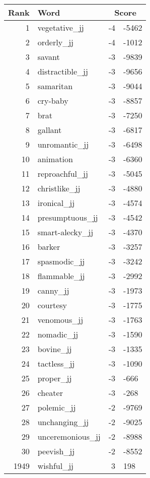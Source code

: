 \begin{longtable}[!htbp]{| rlr@{.}l |}
    \hline
    \textbf{Rank} & \textbf{Word} & \multicolumn{2}{c|}{\textbf{Score}} \\
    \hline
    \endhead
    1 & vegetative\_jj & -4 & -5462 \\
    2 & orderly\_jj & -4 & -1012 \\
    3 & savant & -3 & -9839 \\
    4 & distractible\_jj & -3 & -9656 \\
    5 & samaritan & -3 & -9044 \\
    6 & cry-baby & -3 & -8857 \\
    7 & brat & -3 & -7250 \\
    8 & gallant & -3 & -6817 \\
    9 & unromantic\_jj & -3 & -6498 \\
    10 & animation & -3 & -6360 \\
    11 & reproachful\_jj & -3 & -5045 \\
    12 & christlike\_jj & -3 & -4880 \\
    13 & ironical\_jj & -3 & -4574 \\
    14 & presumptuous\_jj & -3 & -4542 \\
    15 & smart-alecky\_jj & -3 & -4370 \\
    16 & barker & -3 & -3257 \\
    17 & spasmodic\_jj & -3 & -3242 \\
    18 & flammable\_jj & -3 & -2992 \\
    19 & canny\_jj & -3 & -1973 \\
    20 & courtesy & -3 & -1775 \\
    21 & venomous\_jj & -3 & -1763 \\
    22 & nomadic\_jj & -3 & -1590 \\
    23 & bovine\_jj & -3 & -1335 \\
    24 & tactless\_jj & -3 & -1090 \\
    25 & proper\_jj & -3 & -666 \\
    26 & cheater & -3 & -268 \\
    27 & polemic\_jj & -2 & -9769 \\
    28 & unchanging\_jj & -2 & -9025 \\
    29 & unceremonious\_jj & -2 & -8988 \\
    30 & peevish\_jj & -2 & -8552 \\
    1949 & wishful\_jj & 3 & 198 \\

\end{longtable}
